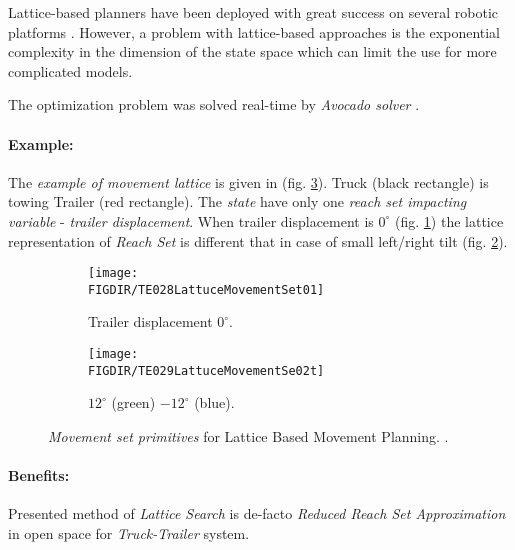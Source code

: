 Lattice-based planners have been deployed with great success on several robotic platforms \cite{pivtoraiko2009differentially,urmson2008william,cirillo2017videogames}. However, a problem with lattice-based approaches is the exponential complexity in the dimension of the state space which can limit the use for more complicated models.

The optimization problem was solved real-time by \emph{Avocado solver} \cite{houska2011acado}.

\paragraph{Example:} The \emph{example of movement lattice} is given in (fig. \ref{fig:latticeMovementPrimitivesExample}). Truck (black rectangle) is towing Trailer (red rectangle). The \emph{state} have only one \emph{reach set impacting variable} - \emph{trailer displacement}. When trailer displacement is $0^{\circ}$ (fig. \ref{fig:noDisplacementLattuce}) the lattice representation of \emph{Reach Set} is different that in case of small left/right tilt (fig. \ref{fig:displacementleftrightlattuce}).

\begin{figure}[H]
    \centering
    \begin{subfigure}{0.48\textwidth}
        \centering
        \texttt{[image: \\FIGDIR/TE028LattuceMovementSet01]}
        \caption{Trailer displacement $0^{\circ}$.}
        \label{fig:noDisplacementLattuce}
    \end{subfigure}
    \begin{subfigure}{0.48\textwidth}
        \centering
        \texttt{[image: \\FIGDIR/TE029LattuceMovementSe02t]} 
        \caption{$12^{\circ}$ (green) $-12^{\circ}$ (blue).}
        \label{fig:displacementleftrightlattuce}
    \end{subfigure}
    
    \caption{\emph{Movement set primitives} for Lattice Based Movement Planning. \cite{ljungqvist2017lattice}. }
    \label{fig:latticeMovementPrimitivesExample}
\end{figure}

\paragraph{Benefits:} Presented method of \emph{Lattice Search}  is  de-facto \emph{Reduced Reach Set Approximation} in open space for \emph{Truck-Trailer} system. 

